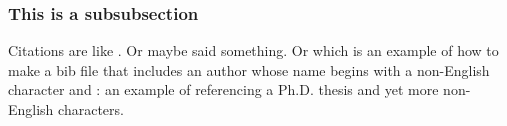 \subsubsection{This is a subsubsection}
Citations are like \cite{goossens93,AbedonHymanThomas2003}.  Or maybe \cite{Abedon1994} said something.  Or \cite{Cerveny} which is an example of how to make a bib file that includes an author whose name begins with a non-English character and \cite{forgues96}: an example of referencing a Ph.D. thesis and yet more non-English characters.




 

